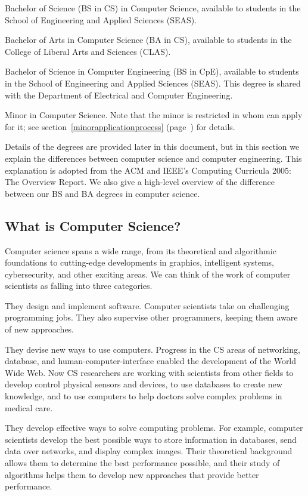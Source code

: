 \begin{itemlist}
\item Bachelor of Science (BS in CS) in Computer Science, available to
  students in the School of Engineering and Applied Sciences (SEAS).
\item Bachelor of Arts in Computer Science (BA in CS), available to
  students in the College of Liberal Arts and Sciences (CLAS).
\item Bachelor of Science in Computer Engineering (BS in CpE),
  available to students in the School of Engineering and Applied
  Sciences (SEAS). This degree is shared with the Department of
  Electrical and Computer Engineering.
\item Minor in Computer Science.  Note that the minor is restricted in
  whom can apply for it; see section~\ref{minorapplicationprocess}
  (page~\pageref{minorapplicationprocess}) for details.
\end{itemlist}

Details of the degrees are provided later in this document, but in
this section we explain the differences between computer science and
computer engineering. This explanation is adopted from the ACM and
IEEE's Computing Curricula 2005: The Overview
Report. We
also give a high-level overview of the difference between our BS and
BA degrees in computer science.

\subsection{What is Computer Science?}

Computer science spans a wide range, from its theoretical and
algorithmic foundations to cutting-edge developments in graphics,
intelligent systems, cybersecurity, and other exciting areas. We can
think of the work of computer scientists as falling into three
categories.

\begin{itemlist}
\item They design and implement software. Computer scientists take on
  challenging programming jobs. They also supervise other programmers,
  keeping them aware of new approaches.
\item They devise new ways to use computers. Progress in the CS areas
  of networking, database, and human-computer-interface enabled the
  development of the World Wide Web. Now CS researchers are working
  with scientists from other fields to develop control physical
  sensors and devices, to use databases to create new knowledge, and
  to use computers to help doctors solve complex problems in medical
  care.
\item They develop effective ways to solve computing problems. For
  example, computer scientists develop the best possible ways to store
  information in databases, send data over networks, and display
  complex images. Their theoretical background allows them to
  determine the best performance possible, and their study of
  algorithms helps them to develop new approaches that provide better
  performance.
\end{itemlist}

